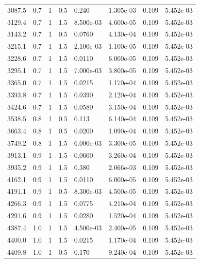 \documentclass[preview]{standalone}
\begin{document}
{{{\begin{tabular}{L{1.2cm}C{1.2cm} C{0.3cm}C{0.5cm} C{1.4cm}C{1.4cm} C{1.4cm}C{1.4cm}}
  3087.5  &   0.7  & 1     & 0.5 &  0.240  & 1.305e-03  & 0.109 &  5.452e-03   \\ 
  3129.4  &   0.7  & 1     & 1.5 &  8.500e-03  & 4.600e-05  & 0.109 &  5.452e-03   \\ 
  3143.2  &   0.7  & 1     & 0.5 &  0.0760  & 4.130e-04  & 0.109 &  5.452e-03   \\ 
  3215.1  &   0.7  & 1     & 1.5 &  2.100e-03  & 1.100e-05  & 0.109 &  5.452e-03   \\ 
  3228.6  &   0.7  & 1     & 1.5 &  0.0110  & 6.000e-05  & 0.109 &  5.452e-03   \\ 
  3295.1  &   0.7  & 1     & 1.5 &  7.000e-03  & 3.800e-05  & 0.109 &  5.452e-03   \\ 
  3365.0  &   0.7  & 1     & 1.5 &  0.0215  & 1.170e-04  & 0.109 &  5.452e-03   \\ 
  3393.8  &   0.7  & 1     & 1.5 &  0.0390  & 2.120e-04  & 0.109 &  5.452e-03   \\ 
  3424.6  &   0.7  & 1     & 1.5 &  0.0580  & 3.150e-04  & 0.109 &  5.452e-03   \\ 
  3538.5  &   0.8  & 1     & 0.5 &  0.113  & 6.140e-04  & 0.109 &  5.452e-03   \\ 
  3663.4  &   0.8  & 1     & 0.5 &  0.0200  & 1.090e-04  & 0.109 &  5.452e-03   \\ 
  3749.2  &   0.8  & 1     & 1.5 &  6.000e-03  & 3.300e-05  & 0.109 &  5.452e-03   \\ 
  3913.1  &   0.9  & 1     & 1.5 &  0.0600  & 3.260e-04  & 0.109 &  5.452e-03   \\ 
  3935.2  &   0.9  & 1     & 1.5 &  0.380  & 2.066e-03  & 0.109 &  5.452e-03   \\ 
  4162.1  &   0.9  & 1     & 1.5 &  0.0110  & 6.000e-05  & 0.109 &  5.452e-03   \\ 
  4191.1  &   0.9  & 1     & 0.5 &  8.300e-03  & 4.500e-05  & 0.109 &  5.452e-03   \\ 
  4266.3  &   0.9  & 1     & 1.5 &  0.0775  & 4.210e-04  & 0.109 &  5.452e-03   \\ 
  4291.6  &   0.9  & 1     & 1.5 &  0.0280  & 1.520e-04  & 0.109 &  5.452e-03   \\ 
  4387.4  &   1.0  & 1     & 1.5 &  4.500e-03  & 2.400e-05  & 0.109 &  5.452e-03   \\ 
  4400.0  &   1.0  & 1     & 1.5 &  0.0215  & 1.170e-04  & 0.109 &  5.452e-03   \\ 
  4409.8  &   1.0  & 1     & 0.5 &  0.170  & 9.240e-04  & 0.109 &  5.452e-03   \\ 

\end{tabular}}}}
\end{document}
